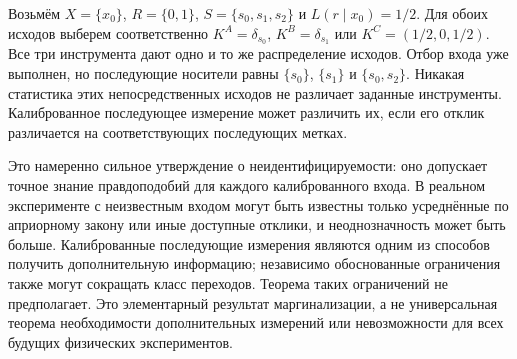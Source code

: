 \begin{example}
\label{ex:same-outcome}
{Возьмём $X=\{x_0\}$, $R=\{0,1\}$, $S=\{s_0,s_1,s_2\}$ и $L(r\mid x_0)=1/2$. Для обоих исходов выберем соответственно $K^A=\delta_{s_0}$, $K^B=\delta_{s_1}$ или $K^C=(1/2,0,1/2)$. Все три инструмента дают одно и то же распределение исходов. Отбор входа уже выполнен, но последующие носители равны $\{s_0\}$, $\{s_1\}$ и $\{s_0,s_2\}$. Никакая статистика этих непосредственных исходов не различает заданные инструменты. Калиброванное последующее измерение может различить их, если его отклик различается на соответствующих последующих метках.}
\end{example}

{Это намеренно сильное утверждение о неидентифицируемости: оно допускает точное знание правдоподобий для каждого калиброванного входа. В реальном эксперименте с неизвестным входом могут быть известны только усреднённые по априорному закону или иные доступные отклики, и неоднозначность может быть больше. Калиброванные последующие измерения являются одним из способов получить дополнительную информацию; независимо обоснованные ограничения также могут сокращать класс переходов. Теорема таких ограничений не предполагает. Это элементарный результат маргинализации, а не универсальная теорема необходимости дополнительных измерений или невозможности для всех будущих физических экспериментов.}

